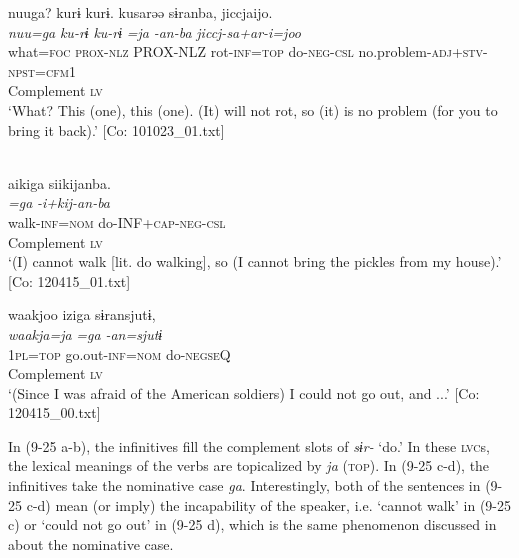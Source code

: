 \ex \label{ex:9.25b} %
    \gllll  nuuga?  kurɨ  kurɨ.  kusarəə  sɨranba,   jiccjaijo.\\
      \textit{nuu=ga}  \textit{ku-rɨ}  \textit{ku-rɨ}  \textit{=ja}  \textit{-an-ba}   \textit{jiccj-sa+ar-i=joo}\\
      what=\textsc{foc}  \textsc{prox}-\textsc{nlz}  PROX-NLZ  rot-\textsc{inf}=\textsc{top}  do-\textsc{neg}-\textsc{csl}   no.problem-\textsc{adj}+\textsc{stv}-\textsc{npst}=\textsc{cfm}1\\
      {} {} {}    Complement  \textsc{lv}\\
    \glt       ‘What? This (one), this (one). (It) will not rot, so (it) is no problem (for you to bring it back).’ [Co: 101023\_01.txt]

\ex\label{ex:9.25c}\relax [= (6-49)]\\
    \gllll  aikiga  siikijanba.\\
      \textit{=ga}  \textit{-i+kij-an-ba}\\
      walk-\textsc{inf}=\textsc{nom}  do-INF+\textsc{cap}-\textsc{neg}-\textsc{csl}\\
      Complement  \textsc{lv}\\
    \glt       ‘(I) cannot walk [lit. do walking], so (I cannot bring the pickles from my house).’ [Co: 120415\_01.txt]

\ex \label{ex:9.25d} %
    \gllll  waakjoo  iziga  sɨransjutɨ,\\
      \textit{waakja=ja}  \textit{=ga}  \textit{-an=sjutɨ}\\
      1\textsc{pl}=\textsc{top}  go.out-\textsc{inf}=\textsc{nom}  do-\textsc{negseQ}\\
      {}  Complement  \textsc{lv}\\
    \glt       ‘(Since I was afraid of the American soldiers) I could not go out, and ...’ [Co: 120415\_00.txt]
    \z
\z

In (9-25 a-b), the infinitives fill the complement slots of \textit{sɨr-} ‘do.’ In these \textsc{lvc}s, the lexical meanings of the verbs are topicalized by \textit{ja} (\textsc{top}). In (9-25 c-d), the infinitives take the nominative case \textit{ga}. Interestingly, both of the sentences in (9-25 c-d) mean (or imply) the incapability of the speaker, i.e. ‘cannot walk’ in (9-25 c) or ‘could not go out’ in (9-25 d), which is the same phenomenon discussed in  about the nominative case.

